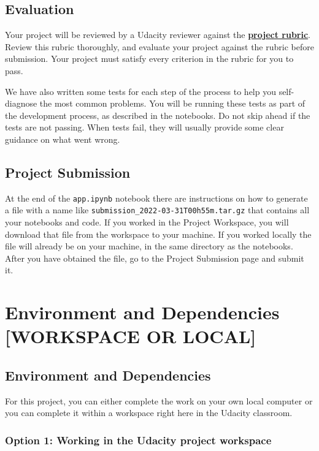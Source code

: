 \subsection{Evaluation}

Your project will be reviewed by a Udacity reviewer against the \href{https://learn.udacity.com/rubric/4814}{\textbf{project rubric}}. Review this rubric thoroughly, and evaluate your project against the rubric before submission. Your project must satisfy every criterion in the rubric for you to pass.

We have also written some tests for each step of the process to help you self-diagnose the most common problems. You will be running these tests as part of the development process, as described in the notebooks. Do not skip ahead if the tests are not passing. When tests fail, they will usually provide some clear guidance on what went wrong.

\subsection{Project Submission}

At the end of the \verb|app.ipynb| notebook there are instructions on how to generate a file with a name like \verb|submission_2022-03-31T00h55m.tar.gz| that contains all your notebooks and code. If you worked in the Project Workspace, you will download that file from the workspace to your machine. If you worked locally the file will already be on your machine, in the same directory as the notebooks. After you have obtained the file, go to the Project Submission page and submit it.


\section{Environment and Dependencies [WORKSPACE OR LOCAL]}

\subsection{Environment and Dependencies}

For this project, you can either complete the work on your own local computer or you can complete it within a workspace right here in the Udacity classroom.

\subsubsection{Option 1: Working in the Udacity project workspace}

